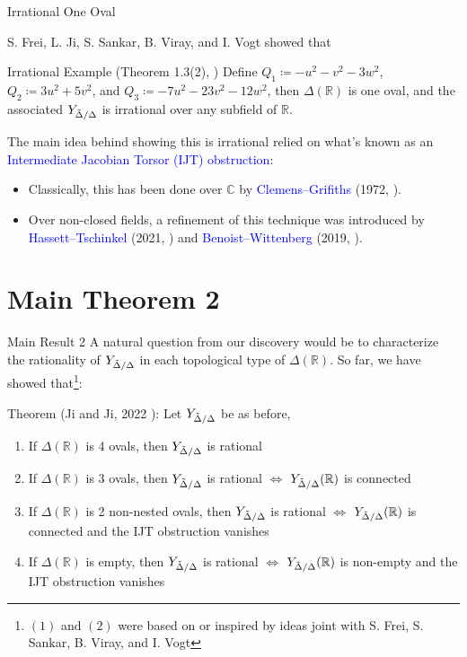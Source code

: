 \documentclass[hyperref, notheorems]{beamer}
\newcommand{\Rbb}{\mathbb{R}}
\newcommand{\Cbb}{\mathbb{C}}
\newcommand{\txtblue}{\textcolor{blue}}
\newcommand{\Ydd}{Y_{\Tilde{\Delta} /\Delta}}
\theoremstyle{definition}
\begin{document}
\begin{frame}{Irrational One Oval}

S. Frei, L. Ji, S. Sankar, B. Viray, and I. Vogt showed that
\begin{block}{Irrational Example (Theorem 1.3(2), \cite{FJSVV})}
    Define $Q_1 \coloneqq  -u^2 - v^2 - 3w^2$, $Q_2 \coloneqq 3u^2 + 5v^2$, and $Q_3 \coloneqq -7u^2 - 23v^2 - 12w^2$, then $\Delta(\Rbb)$ is one oval, and the associated $\Ydd$ is irrational over any subfield of $\Rbb$.
\end{block}

The main idea behind showing this is irrational relied on what's known as an \txtblue{Intermediate Jacobian Torsor (IJT) obstruction}:
\begin{itemize}
    \item Classically, this has been done over $\Cbb$ by \txtblue{Clemens–Grifiths} (1972, \cite{Clemens-Griffiths-ij}).
    \item Over non-closed fields, a refinement of this technique was introduced by \txtblue{Hassett–Tschinkel} (2021, \cite{ht-intersection-quadrics}) and \txtblue{Benoist–Wittenberg} (2019, \cite{bw-ij}).
\end{itemize}
\end{frame}

\section{Main Theorem 2}
\begin{frame}{Main Result 2}
    A natural question from our discovery would be to characterize the rationality of $\Ydd$ in each topological type of $\Delta(\Rbb)$. So far, we have showed that\footnote{$(1)$ and $(2)$ were based on or inspired by ideas joint with S. Frei, S. Sankar, B. Viray, and I. Vogt}:
    \begin{block}{Theorem (Ji and Ji, 2022 \cite{main-paper}):}
        Let $\Ydd$ be as before,
        \begin{enumerate}
        \item If $\Delta(\Rbb)$ is 4 ovals, then $\Ydd$ is rational
        \item If $\Delta(\Rbb)$ is 3 ovals, then $\Ydd$ is rational $\iff$ $\Ydd(\Rbb)$ is connected
        \item If $\Delta(\Rbb)$ is 2 non-nested ovals, then $\Ydd$ is rational $\iff$ $\Ydd(\Rbb)$ is connected and the IJT obstruction vanishes
        \item If $\Delta(\Rbb)$ is empty, then $\Ydd$ is rational $\iff$ $\Ydd(\Rbb)$ is non-empty and the IJT obstruction vanishes
    \end{enumerate}
    \end{block}
\end{frame}
\end{document}
